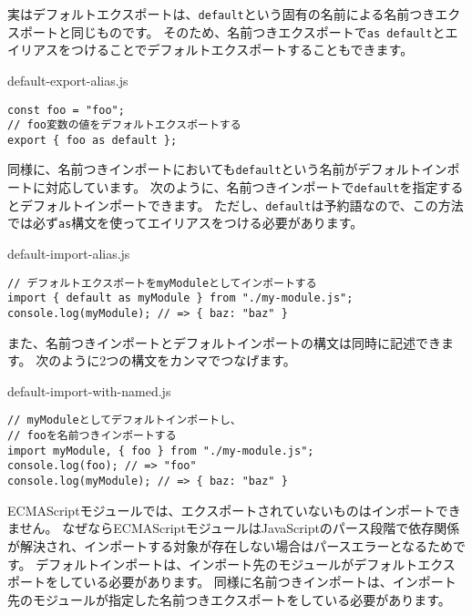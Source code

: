 実はデフォルトエクスポートは、\texttt{default}という固有の名前による名前つきエクスポートと同じものです。
そのため、名前つきエクスポートで\texttt{as default}とエイリアスをつけることでデフォルトエクスポートすることもできます。

\begin{listtitle}
default-export-alias.js
\end{listtitle}
\begin{lstlisting}
const foo = "foo";
// foo変数の値をデフォルトエクスポートする
export { foo as default };
\end{lstlisting}
\listend

同様に、名前つきインポートにおいても\texttt{default}という名前がデフォルトインポートに対応しています。
次のように、名前つきインポートで\texttt{default}を指定するとデフォルトインポートできます。
ただし、\texttt{default}は予約語なので、この方法では必ず\texttt{as}構文を使ってエイリアスをつける必要があります。

\begin{listtitle}
default-import-alias.js
\end{listtitle}
\begin{lstlisting}
// デフォルトエクスポートをmyModuleとしてインポートする
import { default as myModule } from "./my-module.js";
console.log(myModule); // => { baz: "baz" }
\end{lstlisting}
\listend

また、名前つきインポートとデフォルトインポートの構文は同時に記述できます。
次のように2つの構文をカンマでつなげます。

\begin{listtitle}
default-import-with-named.js
\end{listtitle}
\begin{lstlisting}
// myModuleとしてデフォルトインポートし、
// fooを名前つきインポートする
import myModule, { foo } from "./my-module.js";
console.log(foo); // => "foo"
console.log(myModule); // => { baz: "baz" }
\end{lstlisting}
\listend

ECMAScriptモジュールでは、エクスポートされていないものはインポートできません。
なぜならECMAScriptモジュールはJavaScriptのパース段階で依存関係が解決され、インポートする対象が存在しない場合はパースエラーとなるためです。
デフォルトインポートは、インポート先のモジュールがデフォルトエクスポートをしている必要があります。
同様に名前つきインポートは、インポート先のモジュールが指定した名前つきエクスポートをしている必要があります。

